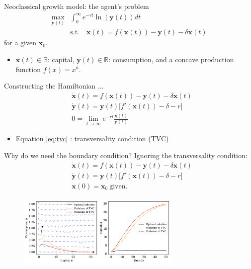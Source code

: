 \documentclass[aspectratio=169,10pt]{beamer}
\begin{document}
\begin{frame}{Neoclassical growth model: the agent's problem}
	\begin{align*}
		\max_{\mathbf{y}(t)} &\int_0^\infty e^{-rt}\ln(\mathbf{y}(t))dt\\
		& \text{s.t.} \quad \dot{\mathbf{x}}(t) = f(\mathbf{x}(t)) - \mathbf{y}(t)-\delta \mathbf{x}(t)
	\end{align*}
for a given $\mathbf{x}_0$.
\begin{itemize}
	\item $\mathbf{x}(t)\in \mathbb{R}$: capital, $\mathbf{y}(t)\in \mathbb{R}$: consumption, and a concave production function $f(x) = x^a$.
	\vspace{0.1in}
\end{itemize}

Constructing the Hamiltonian ...
	\begin{align}
		&\dot{\mathbf{x}}(t) = f(\mathbf{x}(t)) - \mathbf{y}(t)-\delta \mathbf{x}(t)\\
		&\dot{\mathbf{y}}(t) = \mathbf{y}(t)\big[f'(\mathbf{x}(t)) -\delta -r\big]\\
		& 0 = \lim_{t\rightarrow \infty} e^{-rt}\frac{\mathbf{x}(t)}{\mathbf{y}(t)}
		\label{eq:tvc}
	\end{align}
	\begin{itemize}
		\item Equation \cref{eq:tvc} : transversality condition (TVC)
	\end{itemize}
\end{frame}

\begin{frame}{Why do we need the boundary condition?}
	Ignoring the transversality condition:
\begin{align*}
	&\dot{\mathbf{x}}(t) = f(\mathbf{x}(t)) - \mathbf{y}(t)-\delta \mathbf{x}(t)\\
	&\dot{\mathbf{y}}(t) = \mathbf{y}(t)\big[f'(\mathbf{x}(t)) -\delta -r\big]\\
	& \mathbf{x}(0) = \mathbf{x}_0 ~ \text{given}. 
\end{align*}
	\begin{figure}[t!]
		\centering
		\vspace{-4mm}
		\includegraphics[width=0.70\textwidth]{figs/TVC_violation.pdf}
		\vspace{-4mm}
	\end{figure}
\end{frame}
\end{document}
